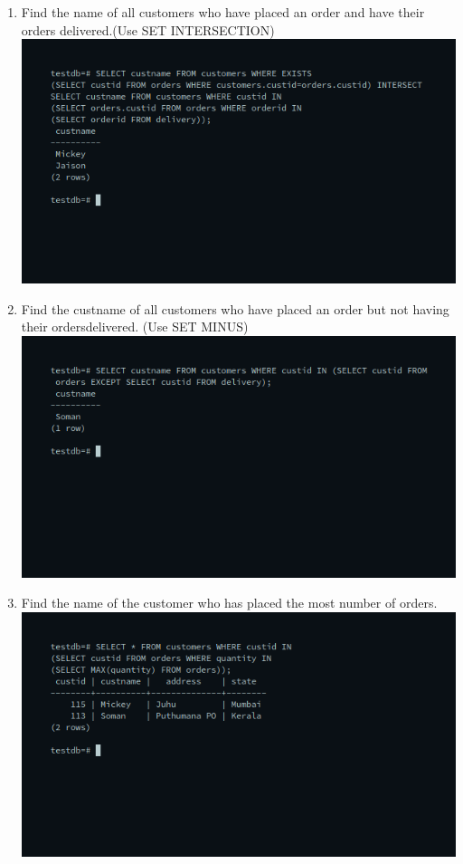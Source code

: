 \documentclass[10pt,a4paper,titlepage]{report}
\begin{document}
{\begin{enumerate}
	\item Find the name of all customers who have placed an order and have their orders delivered.(Use SET INTERSECTION)\newline
	\includegraphics[width=\linewidth]{../Images/Joins/7.png}
	\item Find the custname of all customers who have placed an order but not having their ordersdelivered. (Use SET MINUS)\newline
	\includegraphics[width=\linewidth]{../Images/Joins/8.png}
	\item Find the name of the customer who has placed the most number of orders.\newline
	\includegraphics[width=\linewidth]{../Images/Joins/9.png}

\end{enumerate}}
\end{document}
